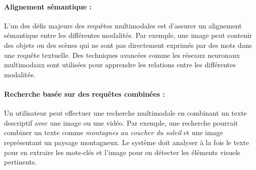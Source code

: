 \begin{section}
 \paragraph{Alignement sémantique :} L'un des défis majeurs des requêtes multimodales est d'assurer un alignement
 sémantique entre les différentes modalités. Par exemple, une image peut
 contenir des objets ou des scènes qui ne sont pas directement exprimés par des
 mots dans une requête textuelle. Des techniques avancées comme les réseaux
 neuronaux multimodaux sont utilisées pour apprendre les relations entre les
 différentes modalités.

 \paragraph{Recherche basée sur des requêtes combinées :} Un utilisateur peut effectuer une recherche multimodale en combinant un texte
 descriptif avec une image ou une vidéo. Par exemple, une recherche pourrait
 combiner un texte comme \emph{montagnes au coucher du soleil} et une image
 représentant un paysage montagneux. Le système doit analyser à la fois le texte
 pour en extraire les mots-clés et l'image pour en détecter les éléments visuels
 pertinents.

\end{section}
